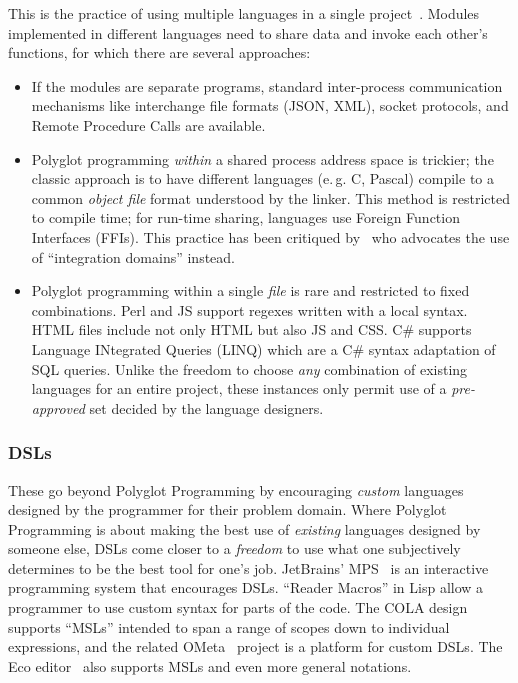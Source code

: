 \documentclass[ twoside,openright,titlepage,numbers=noenddot,headinclude,footinclude,cleardoublepage=empty,abstract=on,
                BCOR=5mm,paper=a4,fontsize=11pt
                ]{scrreprt}
\newcommand{\eg}{e.\,g.}
\providecommand{\tightlist}{}\newenvironment{longtable}[2]{\begin{tabular}}{\end{tabular}}
\theoremstyle{definition}
\begin{document}
This is the practice of using multiple languages in a single
project~\parencite{Polyglot}. Modules implemented in different languages
need to share data and invoke each other's functions, for which there
are several approaches:

\begin{itemize}
\tightlist
\item
  If the modules are separate programs, standard inter-process
  communication mechanisms like interchange file formats (JSON, XML),
  socket protocols, and Remote Procedure Calls are available.
\item
  Polyglot programming \emph{within} a shared process address space is
  trickier; the classic approach is to have different languages (\eg{}
  C, Pascal) compile to a common \emph{object file} format understood by
  the linker. This method is restricted to compile time; for run-time
  sharing, languages use Foreign Function Interfaces (FFIs). This
  practice has been critiqued by~\textcite{KellMMM} who advocates the
  use of ``integration domains'' instead.
\item
  Polyglot programming within a single \emph{file} is rare and
  restricted to fixed combinations. Perl and \ac{JS} support regexes
  written with a local syntax. HTML files include not only HTML but also
  \ac{JS} and CSS. C\# supports Language INtegrated Queries (LINQ) which
  are a C\# syntax adaptation of SQL queries. Unlike the freedom to
  choose \emph{any} combination of existing languages for an entire
  project, these instances only permit use of a \emph{pre-approved} set
  decided by the language designers.
\end{itemize}

\hypertarget{section-1}{\subsubsection{\texorpdfstring{\Aclp{DSL}}{}}\label{section-1}}

These go beyond Polyglot Programming by encouraging \emph{custom}
languages designed by the programmer for their problem domain. Where
Polyglot Programming is about making the best use of \emph{existing}
languages designed by someone else, \acp{DSL} come closer to a
\emph{freedom} to use what one subjectively determines to be the best
tool for one's job. JetBrains' MPS~\parencite{MPS} is an interactive
programming system that encourages \acp{DSL}. ``Reader Macros'' in Lisp
allow a programmer to use custom syntax for parts of the code. The
\ac{COLA} design~\parencite{COLAs} supports ``\aclp{MSL}'' intended to
span a range of scopes down to individual expressions, and the related
OMeta~\parencite{OMeta} project is a platform for custom \acp{DSL}. The
Eco editor~\parencite{Eco} also supports \acp{MSL} and even more general
notations.
\end{document}
